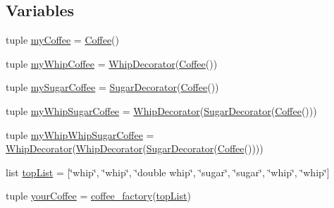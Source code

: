 \subsection*{Variables}
\begin{DoxyCompactItemize}
\item 
tuple \hyperlink{namespacememoryoracle_1_1whip_a699c7d4f532bf531884c1b8d63e3c54a}{my\+Coffee} = \hyperlink{classmemoryoracle_1_1whip_1_1Coffee}{Coffee}()
\item 
tuple \hyperlink{namespacememoryoracle_1_1whip_a02937cc57ed7ecd4a098d2ff3c169f41}{my\+Whip\+Coffee} = \hyperlink{classmemoryoracle_1_1whip_1_1WhipDecorator}{Whip\+Decorator}(\hyperlink{classmemoryoracle_1_1whip_1_1Coffee}{Coffee}())
\item 
tuple \hyperlink{namespacememoryoracle_1_1whip_a5499987513ec35b1d99b12773c508c06}{my\+Sugar\+Coffee} = \hyperlink{classmemoryoracle_1_1whip_1_1SugarDecorator}{Sugar\+Decorator}(\hyperlink{classmemoryoracle_1_1whip_1_1Coffee}{Coffee}())
\item 
tuple \hyperlink{namespacememoryoracle_1_1whip_ad09a6bd0136da3334447b1700114201c}{my\+Whip\+Sugar\+Coffee} = \hyperlink{classmemoryoracle_1_1whip_1_1WhipDecorator}{Whip\+Decorator}(\hyperlink{classmemoryoracle_1_1whip_1_1SugarDecorator}{Sugar\+Decorator}(\hyperlink{classmemoryoracle_1_1whip_1_1Coffee}{Coffee}()))
\item 
tuple \hyperlink{namespacememoryoracle_1_1whip_a016df199d94ab221fd5793992d1209af}{my\+Whip\+Whip\+Sugar\+Coffee} = \hyperlink{classmemoryoracle_1_1whip_1_1WhipDecorator}{Whip\+Decorator}(\hyperlink{classmemoryoracle_1_1whip_1_1WhipDecorator}{Whip\+Decorator}(\hyperlink{classmemoryoracle_1_1whip_1_1SugarDecorator}{Sugar\+Decorator}(\hyperlink{classmemoryoracle_1_1whip_1_1Coffee}{Coffee}())))
\item 
list \hyperlink{namespacememoryoracle_1_1whip_ae603092dfc18fbff7a0452dd92457ec6}{top\+List} = \mbox{[}\char`\"{}whip\char`\"{}, \char`\"{}whip\char`\"{}, \char`\"{}double whip\char`\"{}, \char`\"{}sugar\char`\"{}, \char`\"{}sugar\char`\"{}, \char`\"{}whip\char`\"{}, \char`\"{}whip\char`\"{}\mbox{]}
\item 
tuple \hyperlink{namespacememoryoracle_1_1whip_a9008ef35cee0e5d2fe14e842629ee8e3}{your\+Coffee} = \hyperlink{namespacememoryoracle_1_1whip_ab9ffad7c18a9ef305221ac23e51d72cd}{coffee\+\_\+factory}(\hyperlink{namespacememoryoracle_1_1whip_ae603092dfc18fbff7a0452dd92457ec6}{top\+List})
\end{DoxyCompactItemize}


